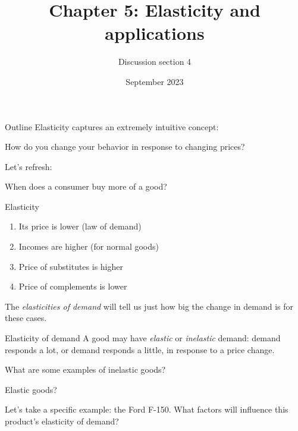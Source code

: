 \documentclass[aspectratio=169]{beamer}
\title{Chapter 5: Elasticity and applications}
\author{Discussion section 4}
\date{September 2023}
\begin{document}
\begin{frame}
    \titlepage 
\end{frame}

\begin{frame}{Outline}
    Elasticity captures an extremely intuitive concept: 
    
    \begin{center}
        How do you change your behavior in response to changing prices?
    \end{center}

    \medskip

    Let's refresh:

    \begin{center}
        When does a consumer buy more of a good?
    \end{center}

\end{frame}

\begin{frame}{Elasticity}
    \begin{enumerate}
        \item Its price is lower (law of demand)
        \item Incomes are higher (for normal goods)
        \item Price of substitutes is higher
        \item Price of complements is lower
    \end{enumerate}

    \medskip

    The \textit{elasticities of demand} will tell us just how big the change in demand is for these cases.
\end{frame}

\begin{frame}{Elasticity of demand}
    A good may have \textit{elastic} or \textit{inelastic} demand: demand responds a lot, or demand responds a little, in response to a price change.

    \medskip

    What are some examples of inelastic goods? 
    
    \medskip

    Elastic goods?

    \medskip

    \medskip

    Let's take a specific example: the Ford F-150. What factors will influence this product's elasticity of demand?
\end{frame}
\end{document}
